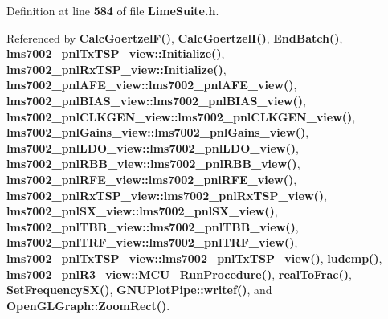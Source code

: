 Definition at line {\bf 584} of file {\bf Lime\+Suite.\+h}.



Referenced by {\bf Calc\+Goertzel\+F()}, {\bf Calc\+Goertzel\+I()}, {\bf End\+Batch()}, {\bf lms7002\+\_\+pnl\+Tx\+T\+S\+P\+\_\+view\+::\+Initialize()}, {\bf lms7002\+\_\+pnl\+Rx\+T\+S\+P\+\_\+view\+::\+Initialize()}, {\bf lms7002\+\_\+pnl\+A\+F\+E\+\_\+view\+::lms7002\+\_\+pnl\+A\+F\+E\+\_\+view()}, {\bf lms7002\+\_\+pnl\+B\+I\+A\+S\+\_\+view\+::lms7002\+\_\+pnl\+B\+I\+A\+S\+\_\+view()}, {\bf lms7002\+\_\+pnl\+C\+L\+K\+G\+E\+N\+\_\+view\+::lms7002\+\_\+pnl\+C\+L\+K\+G\+E\+N\+\_\+view()}, {\bf lms7002\+\_\+pnl\+Gains\+\_\+view\+::lms7002\+\_\+pnl\+Gains\+\_\+view()}, {\bf lms7002\+\_\+pnl\+L\+D\+O\+\_\+view\+::lms7002\+\_\+pnl\+L\+D\+O\+\_\+view()}, {\bf lms7002\+\_\+pnl\+R\+B\+B\+\_\+view\+::lms7002\+\_\+pnl\+R\+B\+B\+\_\+view()}, {\bf lms7002\+\_\+pnl\+R\+F\+E\+\_\+view\+::lms7002\+\_\+pnl\+R\+F\+E\+\_\+view()}, {\bf lms7002\+\_\+pnl\+Rx\+T\+S\+P\+\_\+view\+::lms7002\+\_\+pnl\+Rx\+T\+S\+P\+\_\+view()}, {\bf lms7002\+\_\+pnl\+S\+X\+\_\+view\+::lms7002\+\_\+pnl\+S\+X\+\_\+view()}, {\bf lms7002\+\_\+pnl\+T\+B\+B\+\_\+view\+::lms7002\+\_\+pnl\+T\+B\+B\+\_\+view()}, {\bf lms7002\+\_\+pnl\+T\+R\+F\+\_\+view\+::lms7002\+\_\+pnl\+T\+R\+F\+\_\+view()}, {\bf lms7002\+\_\+pnl\+Tx\+T\+S\+P\+\_\+view\+::lms7002\+\_\+pnl\+Tx\+T\+S\+P\+\_\+view()}, {\bf ludcmp()}, {\bf lms7002\+\_\+pnl\+R3\+\_\+view\+::\+M\+C\+U\+\_\+\+Run\+Procedure()}, {\bf real\+To\+Frac()}, {\bf Set\+Frequency\+S\+X()}, {\bf G\+N\+U\+Plot\+Pipe\+::writef()}, and {\bf Open\+G\+L\+Graph\+::\+Zoom\+Rect()}.

